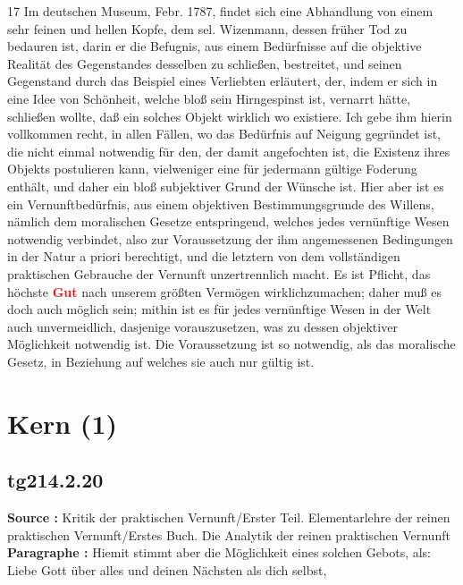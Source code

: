 \documentclass[a4paper,12pt,twoside]{book}
\newcommand{\match}[1]{\textcolor{red}{\textbf{#1}}}
\newcommand{\unnumberedsection}[1]{
	\section*{#1}
	\addcontentsline{toc}{section}{#1}
	\markright{#1}
}
\begin{document}
	17 Im deutschen Museum, Febr. 1787, findet sich eine Abhandlung von einem sehr feinen und hellen Kopfe, dem sel. Wizenmann, dessen früher Tod zu bedauren ist, darin er die Befugnis, aus einem Bedürfnisse auf die objektive Realität des Gegenstandes desselben zu schließen, bestreitet, und seinen Gegenstand durch das Beispiel eines Verliebten erläutert, der, indem er sich in eine Idee von Schönheit, welche bloß sein Hirngespinst ist, vernarrt hätte, schließen wollte, daß ein solches Objekt wirklich wo existiere. Ich gebe ihm hierin vollkommen recht, in allen Fällen, wo das Bedürfnis auf Neigung gegründet ist, die nicht einmal notwendig für den, der damit angefochten ist, die Existenz ihres Objekts postulieren kann, vielweniger eine für jedermann gültige Foderung enthält, und daher ein bloß subjektiver Grund der Wünsche ist. Hier aber ist es ein Vernunftbedürfnis, aus einem objektiven Bestimmungsgrunde des Willens, nämlich dem moralischen Gesetze entspringend, welches jedes vernünftige Wesen notwendig verbindet, also zur Voraussetzung der ihm angemessenen Bedingungen in der Natur a priori berechtigt, und die letztern von dem vollständigen praktischen Gebrauche der Vernunft unzertrennlich macht. Es ist Pflicht, das höchste \match{Gut} nach unserem größten Vermögen wirklichzumachen; daher muß es doch auch möglich sein; mithin ist es für jedes vernünftige Wesen in der Welt auch unvermeidlich, dasjenige vorauszusetzen, was zu dessen objektiver Möglichkeit notwendig ist. Die Voraussetzung ist so notwendig, als das moralische Gesetz, in Beziehung auf welches sie auch nur gültig ist. 
	
	\unnumberedsection{Kern (1)} 
	\subsection*{tg214.2.20} 
	\textbf{Source : }Kritik der praktischen Vernunft/Erster Teil. Elementarlehre der reinen praktischen Vernunft/Erstes Buch. Die Analytik der reinen praktischen Vernunft\\  
	
	\noindent\textbf{Paragraphe : }Hiemit stimmt aber die Möglichkeit eines solchen Gebots, als: Liebe Gott über alles und deinen Nächsten als dich selbst,
	
\end{document}
